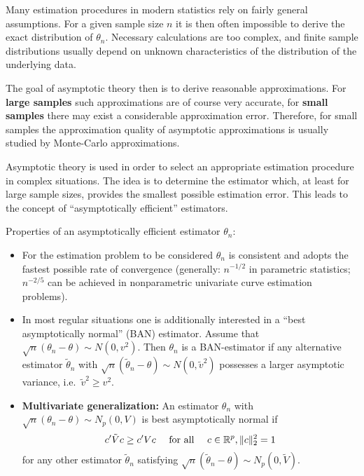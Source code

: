 \documentclass[
]{book}
\providecommand{\tightlist}{%
  \setlength{\itemsep}{0pt}\setlength{\parskip}{0pt}}
\begin{document}
Many estimation procedures in modern statistics rely on fairly general assumptions. For a given sample size \(n\) it is then often impossible to derive the exact distribution of \(\theta_n\). Necessary calculations are too complex, and finite sample distributions usually depend on unknown characteristics of the distribution of the underlying data.

\hfill\break

The goal of asymptotic theory then is to derive reasonable approximations. For \textbf{large samples} such approximations are of course very accurate, for \textbf{small samples} there may exist a considerable approximation error. Therefore, for small samples the approximation quality of asymptotic approximations is usually studied by Monte-Carlo approximations.

\hfill\break

Asymptotic theory is used in order to select an appropriate estimation procedure in complex situations. The idea is to determine the estimator which, at least for large sample sizes, provides the smallest possible estimation error. This leads to the concept of ``asymptotically efficient'' estimators.

\hfill\break

Properties of an asymptotically efficient estimator \(\theta_n\):

\begin{itemize}
\tightlist
\item
  For the estimation problem to be considered \(\theta_n\) is consistent and adopts the fastest possible rate of convergence
  (generally: \(n^{-1/2}\) in parametric statistics; \(n^{-2/5}\) can be achieved in nonparametric univariate curve estimation problems).
\item
  In most regular situations one is additionally interested in a ``best asymptotically normal'' (BAN) estimator. Assume that \(\sqrt{n}(\theta_n -\theta)\sim N(0,v^2)\). Then \(\theta_n\) is a BAN-estimator if any alternative estimator \(\tilde\theta_n\) with
  \(\sqrt{n}(\tilde\theta_n -\theta)\sim N(0,\tilde v^2)\) possesses a larger asymptotic variance, i.e.~\(\tilde v^2\geq v^2\).
\item
  \textbf{Multivariate generalization:} An estimator \(\theta_n\) with \(\sqrt{n}(\theta_n -\theta)\sim N_p(0,V)\) is best asymptotically normal if
  \[c'\tilde V c\geq c'Vc\quad\hbox{ for all }\quad c\in\mathbb{R}^p, \Vert c\Vert_2^2=1\]
  for any other estimator \(\tilde\theta_n\) satisfying \(\sqrt{n}(\tilde\theta_n -\theta)\sim N_p(0,\tilde V)\).
\end{itemize}
\end{document}
